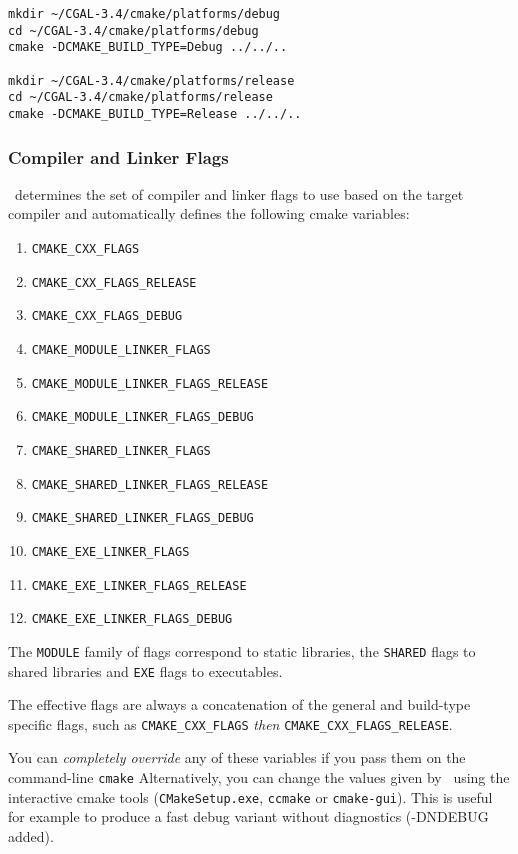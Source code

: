 {\ccTexHtml{\scriptsize}{}
\begin{verbatim}
mkdir ~/CGAL-3.4/cmake/platforms/debug
cd ~/CGAL-3.4/cmake/platforms/debug
cmake -DCMAKE_BUILD_TYPE=Debug ../../..

mkdir ~/CGAL-3.4/cmake/platforms/release
cd ~/CGAL-3.4/cmake/platforms/release
cmake -DCMAKE_BUILD_TYPE=Release ../../..
\end{verbatim}
}

\subsubsection{Compiler and Linker Flags}

\cmake\ determines the set of compiler and linker flags to use based on the target compiler and automatically defines
the following cmake variables:

\begin{enumerate}
\item \texttt{CMAKE\_CXX\_FLAGS}
\item \texttt{CMAKE\_CXX\_FLAGS\_RELEASE}
\item \texttt{CMAKE\_CXX\_FLAGS\_DEBUG}
\item \texttt{CMAKE\_MODULE\_LINKER\_FLAGS}
\item \texttt{CMAKE\_MODULE\_LINKER\_FLAGS\_RELEASE}
\item \texttt{CMAKE\_MODULE\_LINKER\_FLAGS\_DEBUG}
\item \texttt{CMAKE\_SHARED\_LINKER\_FLAGS}
\item \texttt{CMAKE\_SHARED\_LINKER\_FLAGS\_RELEASE}
\item \texttt{CMAKE\_SHARED\_LINKER\_FLAGS\_DEBUG}
\item \texttt{CMAKE\_EXE\_LINKER\_FLAGS}
\item \texttt{CMAKE\_EXE\_LINKER\_FLAGS\_RELEASE}
\item \texttt{CMAKE\_EXE\_LINKER\_FLAGS\_DEBUG}
\end{enumerate}

The \texttt{MODULE} family of flags correspond to static libraries, the \texttt{SHARED} flags to shared libraries
and \texttt{EXE} flags to executables.

The effective flags are always a concatenation of the general and build-type specific flags, such as
\texttt{CMAKE\_CXX\_FLAGS} {\em then} \texttt{CMAKE\_CXX\_FLAGS\_RELEASE}.

You can {\em completely override} any of these variables if you pass them on the command-line \texttt{cmake}
Alternatively, you can change the values given by \cmake\ using the
interactive cmake tools (\texttt{CMakeSetup.exe}, \texttt{ccmake} or \texttt{cmake-gui}).  This is useful for example to produce a fast debug
variant without diagnostics (-DNDEBUG added). 

